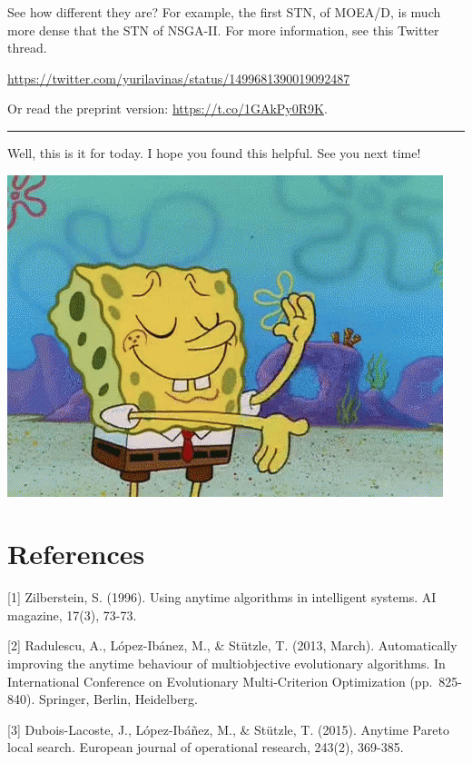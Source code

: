 \documentclass[
]{article}
\begin{document}
See how different they are? For example, the first STN, of MOEA/D, is
much more dense that the STN of NSGA-II. For more information, see this
Twitter thread.

\url{https://twitter.com/yurilavinas/status/1499681390019092487}

Or read the preprint version: \url{https://t.co/1GAkPy0R9K}.

\begin{center}\rule{0.5\linewidth}{0.5pt}\end{center}

Well, this is it for today. I hope you found this helpful. See you next
time!

\begin{center}\includegraphics{gifs/spongebob-done} \end{center}

\hypertarget{references}{%
\section{References}\label{references}}

{[}1{]} Zilberstein, S. (1996). Using anytime algorithms in intelligent
systems. AI magazine, 17(3), 73-73.

{[}2{]} Radulescu, A., López-Ibánez, M., \& Stützle, T. (2013, March).
Automatically improving the anytime behaviour of multiobjective
evolutionary algorithms. In International Conference on Evolutionary
Multi-Criterion Optimization (pp.~825-840). Springer, Berlin,
Heidelberg.

{[}3{]} Dubois-Lacoste, J., López-Ibáñez, M., \& Stützle, T. (2015).
Anytime Pareto local search. European journal of operational research,
243(2), 369-385.
\end{document}
